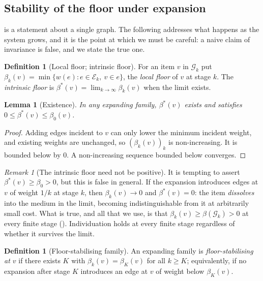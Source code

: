 \documentclass[11pt,twocolumn,a4paper]{article}
\newtheorem{lemma}[theorem]{Lemma}
\theoremstyle{definition}
\newtheorem{definition}[theorem]{Definition}
\theoremstyle{remark}
\newtheorem{remark}[theorem]{Remark}
\newcommand{\Gph}{\mathcal{G}}
\newcommand{\E}{\mathcal{E}}
\newcommand{\wt}{w}
\newcommand{\flo}{\beta}
\begin{document}
\subsection{Stability of the floor under expansion}

 is a statement about a single graph. The following
addresses what happens as the system grows, and it is the point at which
we must be careful: a naive claim of invariance is false, and we state the
true one.

\begin{definition}[Local floor; intrinsic floor]
\label{def:intrinsic}
For an item $v$ in $\Gph_k$ put
$\flo_k(v)=\min\{\wt(e):e\in\E_k,\ v\in e\}$, the \emph{local floor} of
$v$ at stage $k$. The \emph{intrinsic floor} is
$\flo^{*}(v)=\lim_{k\to\infty}\flo_k(v)$ when the limit exists.
\end{definition}

\begin{lemma}[Existence]
\label{lem:intrinsic-exists}
In any expanding family, $\flo^{*}(v)$ exists and satisfies
$0\le\flo^{*}(v)\le\flo_0(v)$.
\end{lemma}

\begin{proof}
Adding edges incident to $v$ can only lower the minimum incident weight,
and existing weights are unchanged, so $(\flo_k(v))_k$ is non-increasing.
It is bounded below by $0$. A non-increasing sequence bounded below
converges.
\end{proof}

\begin{remark}[The intrinsic floor need not be positive]
\label{rem:not-positive}
It is tempting to assert $\flo^{*}(v)\ge\flo_0>0$, but this is false in
general. If the expansion introduces edges at $v$ of weight $1/k$ at stage
$k$, then $\flo_k(v)\to0$ and $\flo^{*}(v)=0$: the item \emph{dissolves}
into the medium in the limit, becoming indistinguishable from it at
arbitrarily small cost. What is true, and all that we use, is that
$\flo_k(v)\ge\flo(\Gph_k)>0$ at every finite stage
(). Individuation holds at every finite stage regardless
of whether it survives the limit.
\end{remark}

\begin{definition}[Floor-stabilising family]
\label{def:stabilising}
An expanding family is \emph{floor-stabilising at $v$} if there exists
$K$ with $\flo_k(v)=\flo_K(v)$ for all $k\ge K$; equivalently, if no
expansion after stage $K$ introduces an edge at $v$ of weight below
$\flo_K(v)$.
\end{definition}
\end{document}
